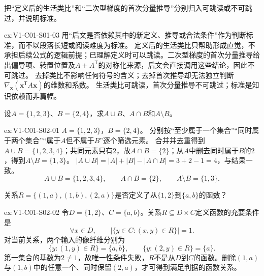 \begin{SLChapterExercisePairSection}
\begin{exercise}[可跳读与不可跳过]\label{ex:V1-C01-S01-03}
把“定义后的生活类比”和“二次型梯度的首次分量推导”分别归入可跳读或不可跳过，并说明标准。
\end{exercise}
\label{sol:V1-C01-S01-03}
\begin{chapterexercisesolution}{ex:V1-C01-S01-03}
\SolPlan 用“后文是否依赖其中的新定义、推导或合法条件”作为判断标准，而不以段落长短或阅读难度为标准。
\SolDerive 定义后的生活类比只帮助形成直觉，不承担后续公式的逻辑前提；已理解定义时可以跳读。二次型梯度的首次分量推导给出偏导项、转置位置及$A+A^{\mathsf T}$的对称化来源，后文会直接调用这些结论，因此不可跳过。
\SolCheck 去掉类比不影响任何符号的含义；去掉首次推导却无法独立判断$\nabla_{\boldsymbol{x}}(\boldsymbol{x}^{\mathsf T}A\boldsymbol{x})$的维数和系数。
\SolAnswer 生活类比可跳读，首次分量推导不可跳过；标准是知识依赖而非篇幅。
\end{chapterexercisesolution}

\begin{exercise}[集合运算]\label{ex:V1-C01-S02-01}
设$A=\{1,2,3\}$、$B=\{2,4\}$，求$A\cup B$、$A\cap B$和$A\setminus B$。
\end{exercise}
\label{sol:V1-C01-S02-01}
\begin{chapterexercisesolution}{ex:V1-C01-S02-01}
\SolGiven $A=\{1,2,3\}$，$B=\{2,4\}$。
\SolPlan 分别按“至少属于一个集合”“同时属于两个集合”“属于$A$但不属于$B$”逐个筛选元素。
\SolDerive 合并并去重得到$A\cup B=\{1,2,3,4\}$；共同元素只有$2$，故$A\cap B=\{2\}$；从$A$中删去同时属于$B$的$2$，得到$A\setminus B=\{1,3\}$。
\SolCheck $|A\cup B|=|A|+|B|-|A\cap B|=3+2-1=4$，与结果一致。
\SolAnswer
\[
A\cup B=\{1,2,3,4\},\qquad A\cap B=\{2\},\qquad A\setminus B=\{1,3\}.
\]
\end{chapterexercisesolution}

\begin{exercise}[函数判定]\label{ex:V1-C01-S02-02}
关系$R=\{(1,a),(1,b),(2,a)\}$是否定义了从$\{1,2\}$到$\{a,b\}$的函数？
\end{exercise}
\label{sol:V1-C01-S02-02}
\begin{chapterexercisesolution}{ex:V1-C01-S02-02}
令$D=\{1,2\}$、$C=\{a,b\}$。关系$R\subseteq D\times C$定义函数的充要条件是
\[
\forall x\in D,\qquad
\left|\{y\in C:(x,y)\in R\}\right|=1.
\]
对当前关系，两个输入的像纤维分别为
\[
\{y:(1,y)\in R\}=\{a,b\},\qquad
\{y:(2,y)\in R\}=\{a\}.
\]
第一集合的基数为$2\ne1$，故唯一性条件失败，$R$不是从$D$到$C$的函数。删除$(1,a)$与$(1,b)$中的任意一个、同时保留$(2,a)$，才可得到满足判据的函数关系。
\end{chapterexercisesolution}


\end{SLChapterExercisePairSection}
